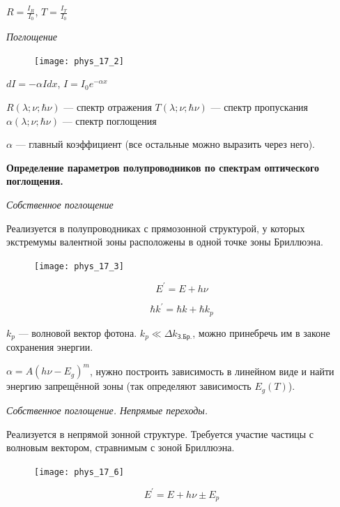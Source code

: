 $R=\frac{I_R}{I_0}$, $T=\frac{I_T}{I_0}$

\textit{Поглощение}

\begin{figure}[h!]
    \centering
    \texttt{[image: phys\_17\_2]}
\end{figure}

$dI = -\alpha I dx$, $I=I_0 e^{-\alpha x}$

$R(\lambda; \nu; \hbar \nu)$ --- спектр отражения
$T(\lambda; \nu; \hbar \nu)$ --- спектр пропускания
$\alpha(\lambda; \nu; \hbar \nu)$ --- спектр поглощения

$\alpha$ --- главный коэффициент (все остальные можно выразить через него).

\textbf{Определение параметров полупроводников по спектрам оптического поглощения.}

\textit{Собственное поглощение}

Реализуется в полупроводниках с прямозонной структурой, у которых экстремумы валентной зоны расположены в одной точке зоны Бриллюэна.

\begin{figure}[h!]
    \centering
    \texttt{[image: phys\_17\_3]}
\end{figure}

$$E^\prime = E + h\nu$$

$$\hbar k^\prime = \hbar k + \hbar k_p$$ 

\noindent $k_p$ --- волновой вектор фотона. $k_p \ll \Delta k_\text{З.Бр.}$, можно принебречь им в законе сохранения энергии.

$\alpha = A (h \nu -E_g)^m$, нужно построить зависимость в линейном виде и найти энергию запрещённой зоны (так определяют зависимость $E_g(T)$).

\begin{figure}[h!]
    \centering
\end{figure}


\textit{Собственное поглощение. Непрямые переходы.}

Реализуется в непрямой зонной структуре. Требуется участие частицы с волновым вектором, стравнимым с зоной Бриллюэна.

\begin{figure}[h!]
    \centering
    \texttt{[image: phys\_17\_6]}
\end{figure}

$$E^\prime = E + h\nu \pm E_p$$

